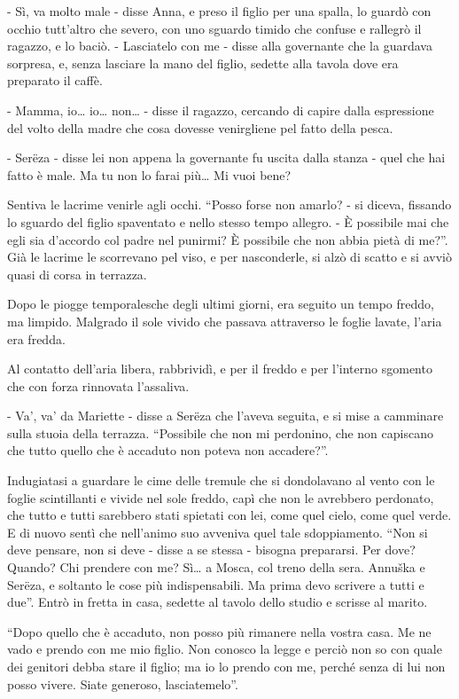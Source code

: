 - Sì, va molto male - disse Anna, e preso il figlio per una spalla, lo guardò con occhio tutt'altro che severo, con uno sguardo timido che confuse e rallegrò il ragazzo, e lo baciò. - Lasciatelo con me - disse alla governante che la guardava sorpresa, e, senza lasciare la mano del figlio, sedette alla tavola dove era preparato il caffè. 

- Mamma, io\ldots{} io\ldots{} non\ldots{} - disse il ragazzo, cercando di capire dalla espressione del volto della madre che cosa dovesse venirgliene pel fatto della pesca. 

- Serëza - disse lei non appena la governante fu uscita dalla stanza - quel che hai fatto è male. Ma tu non lo farai più\ldots{} Mi vuoi bene? 

Sentiva le lacrime venirle agli occhi. ``Posso forse non amarlo? - si diceva, fissando lo sguardo del figlio spaventato e nello stesso tempo allegro. - È possibile mai che egli sia d'accordo col padre nel punirmi? È possibile che non abbia pietà di me?''. Già le lacrime le scorrevano pel viso, e per nasconderle, si alzò di scatto e si avviò quasi di corsa in terrazza. 

Dopo le piogge temporalesche degli ultimi giorni, era seguito un tempo freddo, ma limpido. Malgrado il sole vivido che passava attraverso le foglie lavate, l'aria era fredda. 

Al contatto dell'aria libera, rabbrividì, e per il freddo e per l'interno sgomento che con forza rinnovata l'assaliva. 

- Va', va' da Mariette - disse a Serëza che l'aveva seguita, e si mise a camminare sulla stuoia della terrazza. ``Possibile che non mi perdonino, che non capiscano che tutto quello che è accaduto non poteva non accadere?''. 

Indugiatasi a guardare le cime delle tremule che si dondolavano al vento con le foglie scintillanti e vivide nel sole freddo, capì che non le avrebbero perdonato, che tutto e tutti sarebbero stati spietati con lei, come quel cielo, come quel verde. E di nuovo sentì che nell'animo suo avveniva quel tale sdoppiamento. ``Non si deve pensare, non si deve - disse a se stessa - bisogna prepararsi. Per dove? Quando? Chi prendere con me? Sì\ldots{} a Mosca, col treno della sera. Annuška e Serëza, e soltanto le cose più indispensabili. Ma prima devo scrivere a tutti e due''. Entrò in fretta in casa, sedette al tavolo dello studio e scrisse al marito. 

``Dopo quello che è accaduto, non posso più rimanere nella vostra casa. Me ne vado e prendo con me mio figlio. Non conosco la legge e perciò non so con quale dei genitori debba stare il figlio; ma io lo prendo con me, perché senza di lui non posso vivere. Siate generoso, lasciatemelo''. 

